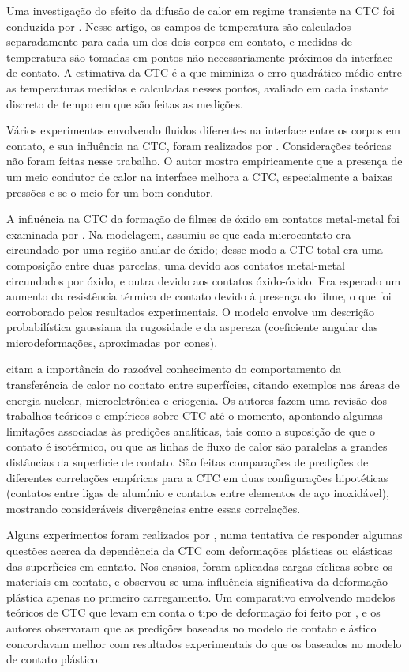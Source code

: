 Uma investigação do efeito da difusão de calor em regime transiente na CTC foi conduzida por \cite{artigo_beck}. Nesse artigo, os campos de temperatura são
calculados separadamente para cada um dos dois corpos em contato, e medidas de temperatura são tomadas em pontos não necessariamente próximos da interface
de contato. A estimativa da CTC é a que miminiza o erro quadrático médio entre as temperaturas medidas e calculadas nesses pontos, avaliado em cada instante
discreto de tempo em que são feitas as medições.

Vários experimentos envolvendo fluidos diferentes na interface entre os corpos em contato, e sua influência na CTC, foram realizados por \cite{artigo_madhusudana}.
Considerações teóricas não foram feitas nesse trabalho. O autor mostra empiricamente que a presença de um meio condutor de calor na interface melhora a CTC,
especialmente a baixas pressões e se o meio for um bom condutor.   

A influência na CTC da formação de filmes de óxido em contatos metal-metal foi examinada por \cite{artigo_astrabadi}. Na modelagem, assumiu-se
que cada microcontato era circundado por uma região anular de óxido; desse modo a CTC total era uma composição entre duas parcelas, uma devido
aos contatos metal-metal circundados por óxido, e outra devido aos contatos óxido-óxido. Era esperado um aumento da resistência térmica de contato
devido à presença do filme, o que foi corroborado pelos resultados experimentais. O modelo envolve um descrição probabilística gaussiana da rugosidade e
da aspereza (coeficiente angular das microdeformações, aproximadas por cones).

\cite{artigo_snaith} citam a importância do razoável conhecimento do comportamento da transferência de calor no contato entre superfícies, citando
exemplos nas áreas de energia nuclear, microeletrônica e criogenia. Os autores fazem uma revisão dos trabalhos teóricos e empíricos sobre CTC
até o momento, apontando algumas limitações associadas às predições analíticas, tais como a suposição de que o contato é isotérmico, ou que as linhas de fluxo
de calor são paralelas a grandes distâncias da superficie de contato. São feitas comparações de predições de diferentes correlações empíricas
para a CTC em duas configurações hipotéticas (contatos entre ligas de alumínio e contatos entre elementos de aço inoxidável), mostrando
consideráveis divergências entre essas correlações.

Alguns experimentos foram realizados por \cite{artigo_williamson}, numa tentativa de responder algumas questões acerca da dependência da CTC com
deformações plásticas ou elásticas das superfícies em contato. Nos ensaios, foram aplicadas cargas cíclicas sobre os materiais em contato, e observou-se
uma influência significativa da deformação plástica apenas no primeiro carregamento. Um comparativo envolvendo modelos teóricos de CTC que levam em conta
o tipo de deformação foi feito por \cite{artigo_mcwaid}, e os autores observaram que as predições baseadas
no modelo de contato elástico concordavam melhor com resultados experimentais do que os baseados no modelo de contato plástico. 

